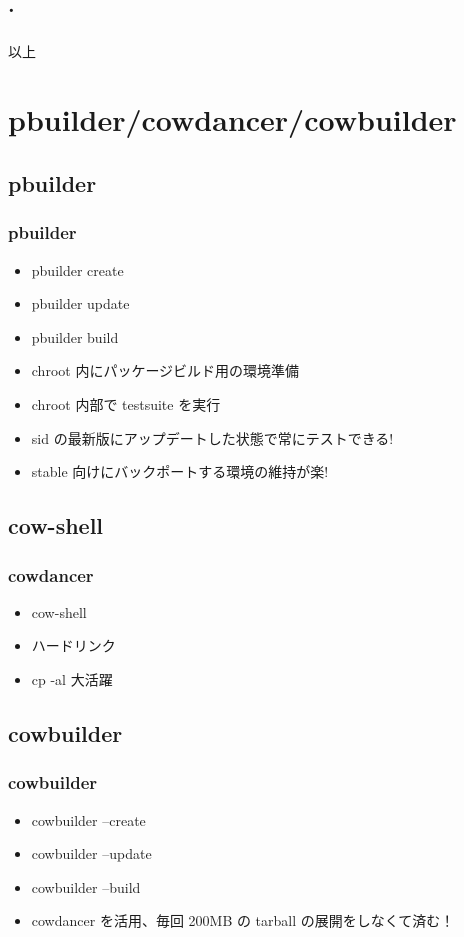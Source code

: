 \documentclass[cjk,dvipdfmx]{beamer}
\begin{document}
\subsection{.}
\begin{frame}
 \frametitle{}

以上
\end{frame}

\section{pbuilder/cowdancer/cowbuilder}
\subsection{pbuilder}

\begin{frame}
\frametitle{pbuilder}
\begin{itemize}
 \item pbuilder create
 \item pbuilder update
 \item pbuilder build
 \item chroot 内にパッケージビルド用の環境準備
 \item chroot 内部で testsuite を実行
 \item sid の最新版にアップデートした状態で常にテストできる!
 \item stable 向けにバックポートする環境の維持が楽!
\end{itemize}
\end{frame}

\subsection{cow-shell}
\begin{frame}
\frametitle{cowdancer}
\begin{itemize}
 \item cow-shell
 \item ハードリンク
 \item cp -al 大活躍
\end{itemize}
\end{frame}

\subsection{cowbuilder}
\begin{frame}
\frametitle{cowbuilder}
\begin{itemize}
 \item cowbuilder --create
 \item cowbuilder --update
 \item cowbuilder --build
 \item cowdancer を活用、毎回 200MB の tarball の展開をしなくて済む！
\end{itemize}
\end{frame}
\end{document}

